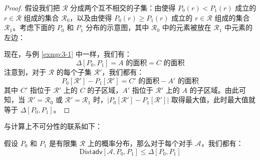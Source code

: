 \begin{proof}
假设我们把 $\mathcal{R}$ 分成两个互不相交的子集：由使得 $P_0(r)<P_1(r)$ 成立的 $r\in\mathcal R$ 组成的集合 $\mathcal{R}_0$，以及由使得 $P_0(r)\geq P_1(r)$ 成立的 $r\in\mathcal R$ 组成的集合 $\mathcal{R}_1$。考虑下面的 $P_0$ 和 $P_1$ 分布的示意图，其中 $\mathcal{R}_0$ 中的元素被放在 $\mathcal{R}_1$ 中元素的左边：

\begin{figure*}[h!]
  \centering
  
\end{figure*}

现在，与例 \ref{exmp:3-1} 中一样，我们有：
\[
\Delta[P_0,P_1]= A \text{ 的面积} = C \text{ 的面积}
\]
注意到，对于 $\mathcal{R}$ 的每个子集 $\mathcal{R}'$，我们都有：
\[
P_0[\mathcal{R}']-P_1[\mathcal{R}']= C' \text{ 的面积} - A' \text{ 的面积}
\]
其中 $C'$ 指位于 $\mathcal{R}'$ 上的 $C$ 的子区域，$A'$ 指位于 $\mathcal{R}'$ 上的 $A$ 的子区域。由此可知，当 $\mathcal{R}'=\mathcal{R}_0$ 或 $\mathcal{R}'=\mathcal{R}_1$ 时，$\big\lvert P_0[\mathcal{R}']-P_1[\mathcal{R}']\big\rvert$ 取得最大值，此时最大值就等于 $\Delta[P_0,P_1]$。
\end{proof}

与计算上不可分性的联系如下：

\begin{theorem}\label{theo:3-11}
假设 $P_0$ 和 $P_1$ 是有限集 $\mathcal{R}$ 上的概率分布，那么对于每个对手 $\mathcal A$，我们都有：
\[
\mathrm{Dist}\mathsf{adv}[\mathcal{A},P_0,P_1]
\leq\Delta[P_0,P_1]
\]
\end{theorem}

